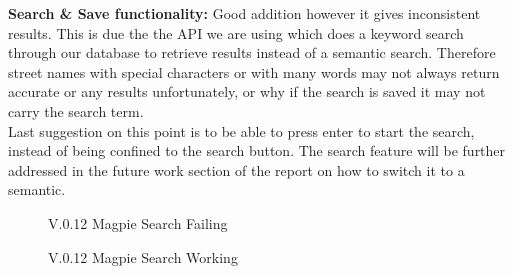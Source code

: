 \noindent \textbf{Search \& Save functionality: }
Good addition however it gives inconsistent results. This is due the the API we are using which does a keyword search through our database to retrieve results instead of a semantic search. Therefore street names with special characters or with many words may not always return accurate or any results unfortunately, or why if the search is saved it may not carry the search term.\\
Last suggestion on this point is to be able to press enter to start the search, instead of being confined to the search button. The search feature will be further addressed in the future work section of the report on how to switch it to a semantic.\\
\begin{figure}[h!]
    \centering
    \caption{V.0.12 Magpie Search Failing}
\end{figure}
\newpage
\begin{figure}[h!]
    \centering
    \caption{V.0.12 Magpie Search Working}
\end{figure}
